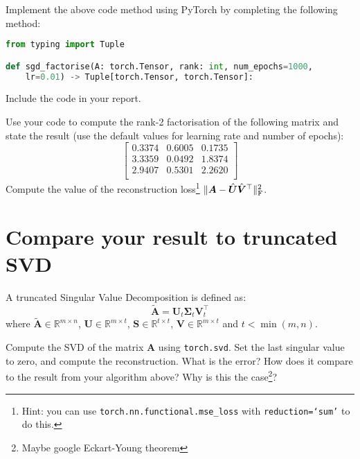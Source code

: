 \documentclass[a4paper]{article}
\begin{document}
\begin{tcolorbox}[title=1.1 Implement gradient-based factorisation (1 mark)]
Implement the above code method using PyTorch by completing the following method:

\begin{lstlisting}[language=Python]
from typing import Tuple

def sgd_factorise(A: torch.Tensor, rank: int, num_epochs=1000, 
	lr=0.01) -> Tuple[torch.Tensor, torch.Tensor]:
\end{lstlisting}

Include the code in your report.

\end{tcolorbox}

\begin{tcolorbox}[title=1.2 Factorise and compute reconstruction error (1 mark)]
Use your code to compute the rank-2 factorisation of the following matrix and state the result (use the default values for learning rate and number of epochs):
\begin{equation*}
	\begin{bmatrix}
		0.3374 & 0.6005 & 0.1735\\
		3.3359 & 0.0492 & 1.8374\\
		2.9407 & 0.5301 & 2.2620\\
	\end{bmatrix}	
\end{equation*}
Compute the value of the reconstruction loss\footnote{Hint: you can use \texttt{torch.nn.functional.mse\_loss} with \texttt{reduction=`sum'} to do this.} $\| \bm A - \hat{\bm U}\hat{\bm V}^\top\|_{\rm F}^2$.
\end{tcolorbox}

\section{Compare your result to truncated SVD}

A truncated Singular Value Decomposition is defined as:
\begin{equation}
	\tilde{\bm A} = \bm U_t \bm \Sigma_t \bm V_t^\top
\end{equation}
where $\tilde{\bm A} \in \mathbb{R}^{m \times n}$, $\bm U \in \mathbb{R}^{m \times t}$, $\bm S \in \mathbb{R}^{t \times t}$, $\bm V \in \mathbb{R}^{m \times t}$ and $t<\min(m,n)$.
\\
\begin{tcolorbox}[title=2.1 Compare to the truncated-SVD (1 mark)]
Compute the SVD of the matrix $\bm A$ using \texttt{torch.svd}. Set the last singular value to zero, and compute the reconstruction. What is the error? How does it compare to the result from your algorithm above? Why is this the case\footnote{Maybe google Eckart-Young theorem}?
\end{tcolorbox}
\end{document}
